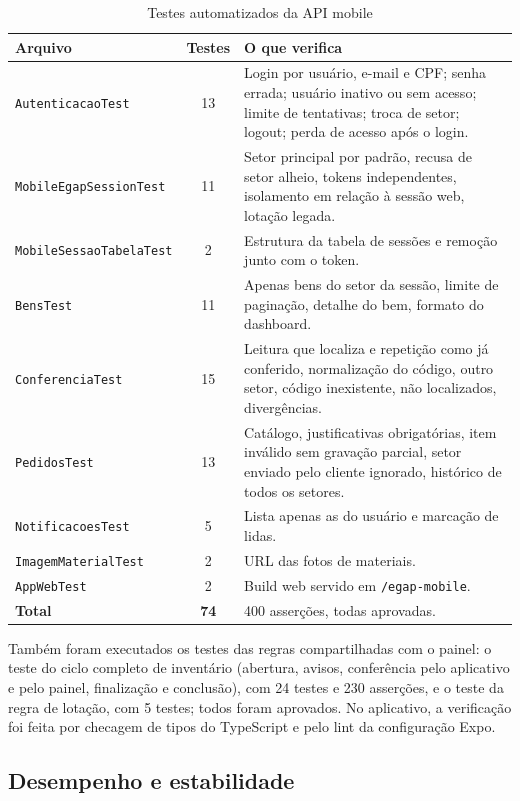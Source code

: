 \documentclass[12pt,a4paper]{article}
\begin{document}
\begin{table}[H]
\centering
\caption{Testes automatizados da API mobile}
\label{tab:testes}
\begin{tabularx}{\textwidth}{L{5.0cm}cY}
\toprule
\textbf{Arquivo} & \textbf{Testes} & \textbf{O que verifica} \\
\midrule
\texttt{AutenticacaoTest} & 13 & Login por usuário, e-mail e CPF; senha errada; usuário inativo ou sem acesso; limite de tentativas; troca de setor; logout; perda de acesso após o login. \\
\texttt{MobileEgapSessionTest} & 11 & Setor principal por padrão, recusa de setor alheio, tokens independentes, isolamento em relação à sessão web, lotação legada. \\
\texttt{MobileSessaoTabelaTest} & 2 & Estrutura da tabela de sessões e remoção junto com o token. \\
\texttt{BensTest} & 11 & Apenas bens do setor da sessão, limite de paginação, detalhe do bem, formato do dashboard. \\
\texttt{ConferenciaTest} & 15 & Leitura que localiza e repetição como já conferido, normalização do código, outro setor, código inexistente, não localizados, divergências. \\
\texttt{PedidosTest} & 13 & Catálogo, justificativas obrigatórias, item inválido sem gravação parcial, setor enviado pelo cliente ignorado, histórico de todos os setores. \\
\texttt{NotificacoesTest} & 5 & Lista apenas as do usuário e marcação de lidas. \\
\texttt{ImagemMaterialTest} & 2 & URL das fotos de materiais. \\
\texttt{AppWebTest} & 2 & Build web servido em \texttt{/egap-mobile}. \\
\midrule
\textbf{Total} & \textbf{74} & 400 asserções, todas aprovadas. \\
\bottomrule
\end{tabularx}
\end{table}

Também foram executados os testes das regras compartilhadas com o painel: o teste do ciclo completo de inventário (abertura, avisos, conferência pelo aplicativo e pelo painel, finalização e conclusão), com 24 testes e 230 asserções, e o teste da regra de lotação, com 5 testes; todos foram aprovados. No aplicativo, a verificação foi feita por checagem de tipos do TypeScript e pelo lint da configuração Expo.

\subsection{Desempenho e estabilidade}
\end{document}
